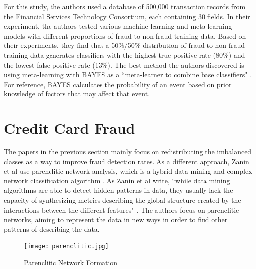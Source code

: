 \documentclass[midd]{thesis}
\begin{document}

For this study, the authors used a database of 500,000 transaction records from the Financial Services Technology Consortium, each containing 30 fields. In their experiment, the authors tested various machine learning and meta-learning models with different proportions of fraud to non-fraud training data. Based on their experiments, they find that a 50\%/50\% distribution of fraud to non-fraud training data generates classifiers with the highest true positive rate (80\%) and the lowest false positive rate (13\%). The best method the authors discovered is using meta-learning with BAYES as a ``meta-learner to combine base classifiers" \cite{Stolfo1997}. For reference, BAYES calculates the probability of an event based on prior knowledge of factors that may affect that event.


\section{Credit Card Fraud}

The papers in the previous section mainly focus on redistributing the imbalanced classes as a way to improve fraud detection rates. As a different approach, Zanin et al use parenclitic network analysis, which is a hybrid data mining and complex network classification algorithm \cite{Zanin2018}. As Zanin et al write, ``while data mining algorithms are able to detect hidden patterns in data, they usually lack the capacity of synthesizing metrics describing the global structure created by the interactions between the different features" \cite{Zanin2018}. The authors focus on parenclitic networks, aiming to represent the data in new ways in order to find other patterns of describing the data. 

\begin{figure}
\centering
  \texttt{[image: parenclitic.jpg]}
  \caption{Parenclitic Network Formation \cite{Boccaletti}}
  \label{fig:parenclitic}
\end{figure}
\end{document}
